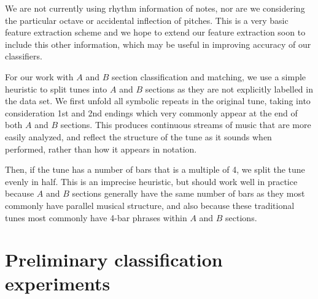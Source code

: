 \documentclass{article} %
\begin{document}
We are not currently using rhythm information of notes, nor are we considering
the particular octave or accidental inflection of pitches. This is a very basic
feature extraction scheme and we hope to extend our feature extraction soon to
include this other information, which may be useful in improving accuracy of our
classifiers.

For our work with $A$ and $B$ section classification and matching, we use a
simple heuristic to split tunes into $A$ and $B$ sections as they are not
explicitly labelled in the data set. We first unfold all symbolic repeats in the
original tune, taking into consideration 1st and 2nd endings which very commonly
appear at the end of both $A$ and $B$ sections. This produces continuous streams
of music that are more easily analyzed, and reflect the structure of the tune as
it sounds when performed, rather than how it appears in notation.

Then, if the tune has a number of bars that is a multiple of 4, we split the
tune evenly in half. This is an imprecise heuristic, but should work well in
practice because $A$ and $B$ sections generally have the same number of bars as
they most commonly have parallel musical structure, and also because these
traditional tunes most commonly have 4-bar phrases within $A$ and $B$ sections.

\section{Preliminary classification experiments}
\end{document}
